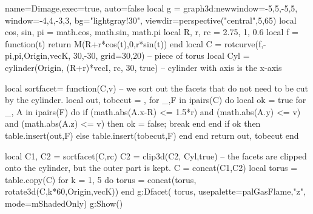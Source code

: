 \documentclass[border=5pt]{standalone}%
\begin{document}
\begin{luadraw}{name=Dimage,exec=true, auto=false}
local g = graph3d:new{window={-5,5,-5,5}, window={-4,4,-3,3}, bg="lightgray!30", viewdir=perspective("central",5,65) }
local cos, sin, pi = math.cos, math.sin, math.pi
local R, r, rc = 2.75, 1, 0.6
local f = function(t) return M(R+r*cos(t),0,r*sin(t)) end
local C  = rotcurve(f,-pi,pi,{Origin,vecK}, 30,-30, {grid={30,20}}) -- piece of torus
local Cyl = cylinder(Origin, (R+r)*vecI, rc, 30, true) -- cylinder with axis is the x-axis

local sortfacet= function(C,v) -- we sort out the facets that do not need to be cut by the cylinder.
    local out, tobecut = {},{}
    for _,F in ipairs(C) do
        local ok = true
        for _, A in ipairs(F) do
            if (math.abs(A.x-R) <= 1.5*r) and (math.abs(A.y) <= v) and (math.abs(A.z) <= v) then ok = false; break end
        end
        if ok then table.insert(out,F) else table.insert(tobecut,F) end
    end
    return out, tobecut
end

local C1, C2 = sortfacet(C,rc)
C2 = clip3d(C2, Cyl,true) -- the facets are clipped onto the cylinder, but the outer part is kept.
C = concat(C1,C2)
local torus = table.copy(C)
for k = 1, 5 do
    torus = concat(torus, rotate3d(C,k*60,{Origin,vecK}))
end
g:Dfacet( torus, {usepalette={palGasFlame,"z"}, mode=mShadedOnly})
g:Show()
\end{luadraw}
\end{document}
